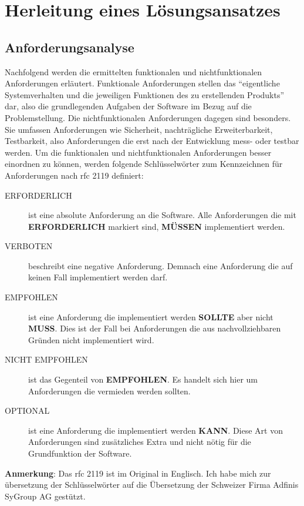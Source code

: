 \documentclass[titlepage]{report}
\begin{document}
\section*{}
\chapter*{Herleitung eines Lösungsansatzes}
\section*{Anforderungsanalyse}
Nachfolgend werden die ermittelten funktionalen und nichtfunktionalen
Anforderungen erläutert. Funktionale Anforderungen stellen das
``eigentliche Systemverhalten und die jeweiligen Funktionen des zu
erstellenden Produkts''\cite[S. 20]{BPSE} dar, also die grundlegenden
Aufgaben der Software im Bezug auf die Problemstellung. Die
nichtfunktionalen Anforderungen dagegen sind besonders. Sie umfassen
Anforderungen wie Sicherheit, nachträgliche Erweiterbarkeit,
Testbarkeit, also Anforderungen die erst nach der Entwicklung
mess\hyp{} oder testbar werden\cite[S. 292]{SNFA}. Um die funktionalen
und nichtfunktionalen Anforderungen besser einordnen zu können, werden
folgende Schlüsselwörter zum Kennzeichnen für Anforderungen nach
\gls{rfc} 2119\cite{RFC2119} definiert:
\begin{description}
    \item[ERFORDERLICH] ist eine absolute Anforderung an die Software. Alle
        Anforderungen die mit \textbf{ERFORDERLICH} markiert sind,
        \textbf{MÜSSEN} implementiert werden.
    \item[VERBOTEN] beschreibt eine negative Anforderung. Demnach eine
        Anforderung die auf keinen Fall implementiert werden darf.
    \item[EMPFOHLEN] ist eine Anforderung die implementiert werden
        \textbf{SOLLTE} aber nicht \textbf{MUSS}. Dies ist der Fall bei
        Anforderungen die aus nachvollziehbaren Gründen nicht
        implementiert wird.
    \item[NICHT EMPFOHLEN] ist das Gegenteil von \textbf{EMPFOHLEN}. Es
        handelt sich hier um Anforderungen die vermieden werden sollten.
    \item[OPTIONAL] ist eine Anforderung die implementiert werden
        \textbf{KANN}. Diese Art von Anforderungen sind
        zusätzliches Extra und nicht nötig für die Grundfunktion der
        Software.
\end{description}
\textbf{Anmerkung}: Das \gls{rfc} 2119 ist im Original in Englisch. Ich
habe mich zur übersetzung der Schlüsselwörter auf die Übersetzung der
Schweizer Firma Adfinis SyGroup AG gestützt\cite{RFC2119DE}.
\end{document}
